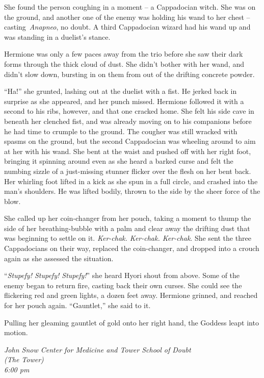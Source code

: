 She found the person coughing in a moment -- a Cappadocian witch. She
was on the ground, and another one of the enemy was holding his wand to
her chest -- casting~\emph{Anapneo}, no doubt. A third Cappadocian
wizard had his wand up and was standing in a duelist's stance.

Hermione was only a few paces away from the trio before she saw their
dark forms through the thick cloud of dust. She didn't bother with her
wand, and didn't slow down, bursting in on them from out of the drifting
concrete powder.

``Ha!'' she grunted, lashing out at the duelist with a fist. He jerked
back in surprise as she appeared, and her punch missed. Hermione
followed it with a second to his ribs, however, and that one cracked
home. She felt his side cave in beneath her clenched fist, and was
already moving on to his companions before he had time to crumple to the
ground. The cougher was still wracked with spasms on the ground, but the
second Cappadocian was wheeling around to aim at her with his wand. She
bent at the waist and pushed off with her right foot, bringing it
spinning around even as she heard a barked curse and felt the numbing
sizzle of a just-missing stunner flicker over the flesh on her bent
back. Her whirling foot lifted in a kick as she spun in a full circle,
and crashed into the man's shoulders. He was lifted bodily, thrown to
the side by the sheer force of the blow.

She called up her coin-changer from her pouch, taking a moment to thump
the side of her breathing-bubble with a palm and clear away the drifting
dust that was beginning to settle on it. \emph{Ker-chak. Ker-chak.
Ker-chak}. She sent the three Cappadocians on their way, replaced the
coin-changer, and dropped into a crouch again as she assessed the
situation.

``\emph{Stupefy! Stupefy! Stupefy!}'' she heard Hyori shout from above.
Some of the enemy began to return fire, casting back their own curses.
She could see the flickering red and green lights, a dozen feet away.
Hermione grinned, and reached for her pouch again. ``Gauntlet,'' she
said to it.

Pulling her gleaming gauntlet of gold onto her right hand, the Goddess
leapt into motion.

\mybreak

\emph{John Snow Center for Medicine and Tower School of Doubt\\
(The Tower)}\\
\emph{6:00 pm}\\


